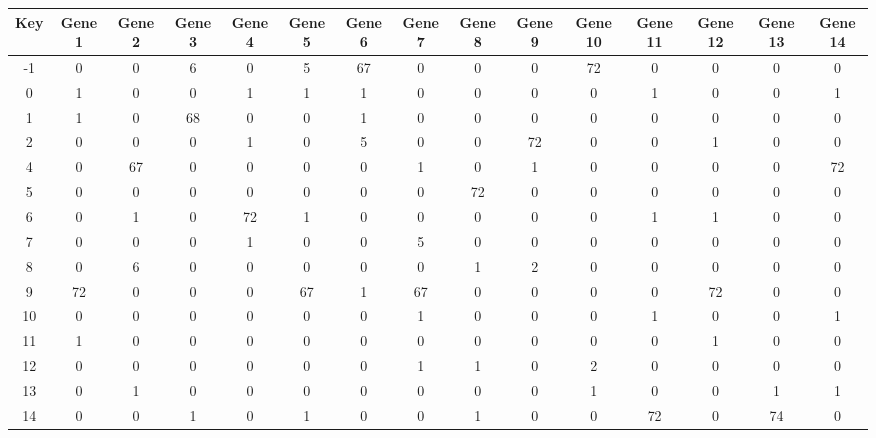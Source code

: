 \begin{tabular}{|c|c|c|c|c|c|c|c|c|c|c|c|c|c|c|}
\hline
Key & Gene 1 & Gene 2 & Gene 3 & Gene 4 & Gene 5 & Gene 6 & Gene 7 & Gene 8 & Gene 9 & Gene 10 & Gene 11 & Gene 12 & Gene 13 & Gene 14 \\
\hline
-1 & 0 & 0 & 6 & 0 & 5 & 67 & 0 & 0 & 0 & 72 & 0 & 0 & 0 & 0 \\
0 & 1 & 0 & 0 & 1 & 1 & 1 & 0 & 0 & 0 & 0 & 1 & 0 & 0 & 1 \\
1 & 1 & 0 & 68 & 0 & 0 & 1 & 0 & 0 & 0 & 0 & 0 & 0 & 0 & 0 \\
2 & 0 & 0 & 0 & 1 & 0 & 5 & 0 & 0 & 72 & 0 & 0 & 1 & 0 & 0 \\
4 & 0 & 67 & 0 & 0 & 0 & 0 & 1 & 0 & 1 & 0 & 0 & 0 & 0 & 72 \\
5 & 0 & 0 & 0 & 0 & 0 & 0 & 0 & 72 & 0 & 0 & 0 & 0 & 0 & 0 \\
6 & 0 & 1 & 0 & 72 & 1 & 0 & 0 & 0 & 0 & 0 & 1 & 1 & 0 & 0 \\
7 & 0 & 0 & 0 & 1 & 0 & 0 & 5 & 0 & 0 & 0 & 0 & 0 & 0 & 0 \\
8 & 0 & 6 & 0 & 0 & 0 & 0 & 0 & 1 & 2 & 0 & 0 & 0 & 0 & 0 \\
9 & 72 & 0 & 0 & 0 & 67 & 1 & 67 & 0 & 0 & 0 & 0 & 72 & 0 & 0 \\
10 & 0 & 0 & 0 & 0 & 0 & 0 & 1 & 0 & 0 & 0 & 1 & 0 & 0 & 1 \\
11 & 1 & 0 & 0 & 0 & 0 & 0 & 0 & 0 & 0 & 0 & 0 & 1 & 0 & 0 \\
12 & 0 & 0 & 0 & 0 & 0 & 0 & 1 & 1 & 0 & 2 & 0 & 0 & 0 & 0 \\
13 & 0 & 1 & 0 & 0 & 0 & 0 & 0 & 0 & 0 & 1 & 0 & 0 & 1 & 1 \\
14 & 0 & 0 & 1 & 0 & 1 & 0 & 0 & 1 & 0 & 0 & 72 & 0 & 74 & 0 \\
\hline
\end{tabular}
